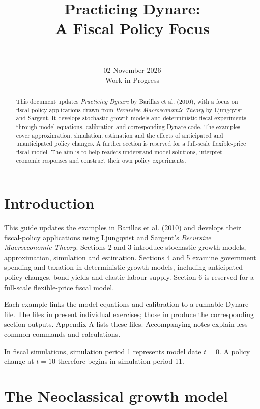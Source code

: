 \documentclass[12pt]{article}
\title{Practicing Dynare: \\ A Fiscal Policy Focus}
\author{\\%
}
\date{02 November 2026 \\ Work-in-Progress \\ \sc{Not for Distribution}}
\begin{document}
\maketitle


\begin{abstract}
This document updates \textit{Practicing Dynare} by Barillas et al. (2010), with a focus on fiscal-policy applications drawn from \textit{Recursive Macroeconomic Theory} by Ljungqvist and Sargent. It develops stochastic growth models and deterministic fiscal experiments through model equations, calibration and corresponding Dynare code. The examples cover approximation, simulation, estimation and the effects of anticipated and unanticipated policy changes. A further section is reserved for a full-scale flexible-price fiscal model. The aim is to help readers understand model solutions, interpret economic responses and construct their own policy experiments.
\end{abstract}

\pagebreak

\tableofcontents

\pagebreak

\section{Introduction}
This guide updates the examples in Barillas et al. (2010) and develops their fiscal-policy applications using Ljungqvist and Sargent's \textit{Recursive Macroeconomic Theory}. Sections 2 and 3 introduce stochastic growth models, approximation, simulation and estimation. Sections 4 and 5 examine government spending and taxation in deterministic growth models, including anticipated policy changes, bond yields and elastic labour supply. Section 6 is reserved for a full-scale flexible-price fiscal model.

Each example links the model equations and calibration to a runnable Dynare file. The files in  present individual exercises; those in  produce the corresponding section outputs. Appendix A lists these files. Accompanying notes explain less common commands and calculations.

In fiscal simulations, simulation period 1 represents model date $t=0$. A policy change at $t=10$ therefore begins in simulation period 11.

\section{The Neoclassical growth model}
\end{document}
